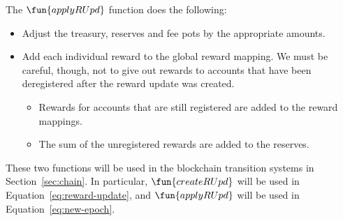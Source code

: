 The $\fun{applyRUpd}$ function does the following:
    \begin{itemize}
      \item Adjust the treasury, reserves and fee pots by the appropriate amounts.
      \item Add each individual reward to the global reward mapping.
        We must be careful, though, not to give out rewards to accounts
        that have been deregistered after the reward update was created.
        \begin{itemize}
          \item Rewards for accounts that are still registered are added to the reward mappings.
          \item The sum of the unregistered rewards are added to the reserves.
        \end{itemize}
    \end{itemize}

These two functions will be used in the blockchain transition systems in Section~\ref{sec:chain}.
In particular,
$\fun{createRUpd}$ will be used in Equation~\ref{eq:reward-update},
and $\fun{applyRUpd}$ will be used in Equation~\ref{eq:new-epoch}.

